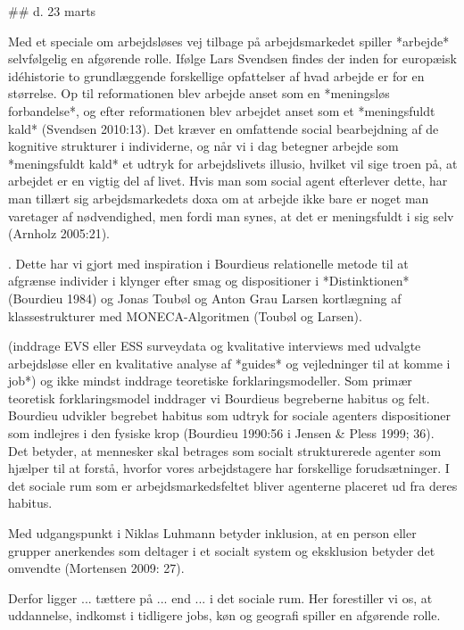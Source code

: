

## d. 23 marts 

Med et speciale om arbejdsløses vej tilbage på arbejdsmarkedet spiller *arbejde* selvfølgelig en afgørende rolle. Ifølge Lars Svendsen findes der inden for europæisk idéhistorie to grundlæggende forskellige opfattelser af hvad arbejde er for en størrelse. Op til reformationen blev arbejde anset som en *meningsløs forbandelse*, og efter reformationen blev arbejdet anset som et *meningsfuldt kald* (Svendsen 2010:13). Det kræver en omfattende social bearbejdning af de kognitive strukturer i individerne, og når vi i dag betegner arbejde som *meningsfuldt kald* et udtryk for arbejdslivets illusio, hvilket vil sige troen på, at arbejdet er en vigtig del af livet. Hvis man som social agent efterlever dette, har man tillært sig arbejdsmarkedets doxa om at arbejde ikke bare er noget man varetager af nødvendighed, men fordi man synes, at det er meningsfuldt i sig selv (Arnholz 2005:21). 


. Dette har vi gjort med inspiration i Bourdieus relationelle metode til at afgrænse individer i klynger efter smag og dispositioner i *Distinktionen* (Bourdieu 1984) og Jonas Toubøl og Anton Grau Larsen kortlægning af klassestrukturer med MONECA-Algoritmen (Toubøl og Larsen).


(inddrage EVS eller ESS surveydata og kvalitative interviews med udvalgte arbejdsløse eller en kvalitative analyse af *guides* og vejledninger til at komme i job*) og ikke mindst inddrage teoretiske forklaringsmodeller. Som primær teoretisk forklaringsmodel inddrager vi Bourdieus begreberne habitus og felt. Bourdieu udvikler begrebet habitus som udtryk for sociale agenters dispositioner som indlejres i den fysiske krop (Bourdieu 1990:56 i Jensen \& Pless 1999; 36). Det betyder, at mennesker skal betrages som socialt strukturerede agenter som hjælper til at forstå, hvorfor vores arbejdstagere har forskellige forudsætninger. I det sociale rum som er arbejdsmarkedsfeltet bliver agenterne placeret ud fra deres habitus.  


Med udgangspunkt i Niklas Luhmann betyder inklusion, at en person eller grupper anerkendes som deltager i et socialt system og eksklusion betyder det omvendte (Mortensen 2009: 27). 


Derfor ligger ... tættere på ... end ... i det sociale rum. Her forestiller vi os, at uddannelse, indkomst i tidligere jobs, køn og geografi spiller en afgørende rolle.













